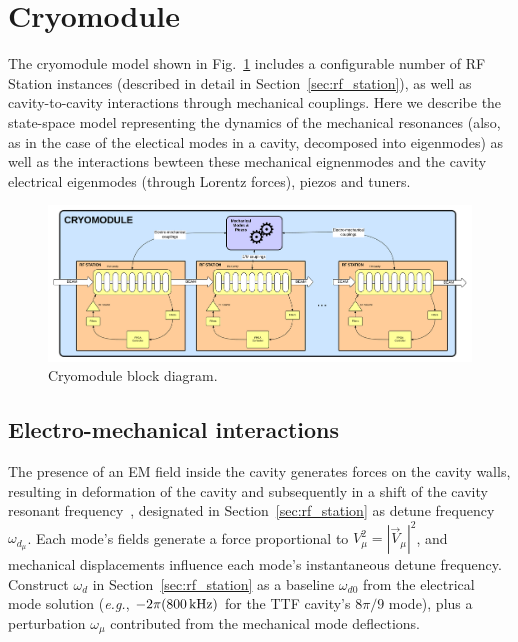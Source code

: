 \documentclass[a4paper,12pt]{article}
\begin{document}
\newpage

\section{Cryomodule}

The cryomodule model shown in Fig.~\ref{fig:Cryomodule_block_diagram} includes a configurable number of RF Station instances (described in detail in Section~\ref{sec:rf_station}), as well as cavity-to-cavity interactions through mechanical couplings. Here we describe the state-space model representing the dynamics of the mechanical resonances (also, as in the case of the electical modes in a cavity, decomposed into eigenmodes) as well as the interactions bewteen these mechanical eignenmodes and the cavity electrical eigenmodes (through Lorentz forces), piezos and tuners.

\begin{figure}
\centering
\includegraphics[scale=0.3]{../figures/Cryomodule_block_diagram.png}
\caption{Cryomodule block diagram.}
\label{fig:Cryomodule_block_diagram}
\end{figure}

\subsection{Electro-mechanical interactions}

The presence of an EM field inside the cavity generates forces on the cavity walls, resulting in deformation of the cavity and subsequently in a shift of the cavity resonant frequency~\cite{ref:delayen}, designated in Section~\ref{sec:rf_station} as detune frequency $\omega_{d_\mu}$. Each mode's fields generate a force proportional to $V_\mu^2 = |\vec V_\mu|^2$, and mechanical displacements influence each mode's instantaneous detune frequency.  Construct $\omega_d$ in Section~\ref{sec:rf_station} as a baseline $\omega_{d0}$ from the electrical mode solution ({\it e.g.}, $-2\pi (800\thinspace {\rm kHz})$ for the TTF cavity's $8\pi/9$ mode), plus a perturbation $\omega_{\mu}$ contributed from the mechanical mode deflections. 
\end{document}
